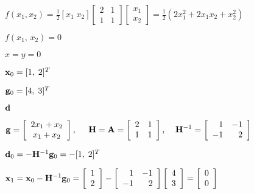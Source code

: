 \documentclass{article}
\def\lthtmlcheckvsize{\ifdim\ht\sizebox<\vsize 
  \ifdim\wd\sizebox<\hsize\expandafter\hfill\fi \expandafter\vfill
  \else\expandafter\vss\fi}%
\begin{document}
{\newpage\clearpage
{}%
$\displaystyle f(x_1,x_2)=\frac{1}{2}[x_1\;x_2]\left[\begin{array}{cc}2&1\\1&1\end{array}\right]
\left[\begin{array}{c}x_1\\x_2\end{array}\right]=\frac{1}{2}(2x_1^2+2x_1x_2+x_2^2)$%
\lthtmlindisplaymathZ
\lthtmlcheckvsize\clearpage}

{\newpage\clearpage
{}%
$ f(x_1,\,x_2)=0$%
\lthtmlindisplaymathZ
\lthtmlcheckvsize\clearpage}

{\newpage\clearpage
{}%
$ x=y=0$%
\lthtmlindisplaymathZ
\lthtmlcheckvsize\clearpage}

{\newpage\clearpage
{}%
$ {\bf x}_0=[1,\;2]^T$%
\lthtmlindisplaymathZ
\lthtmlcheckvsize\clearpage}

{\newpage\clearpage
{}%
$ {\bf g}_0=[4,\;3]^T$%
\lthtmlindisplaymathZ
\lthtmlcheckvsize\clearpage}

{\newpage\clearpage
{}%
$ {\bf d}$%
\lthtmlindisplaymathZ
\lthtmlcheckvsize\clearpage}

{\newpage\clearpage
{}%
$\displaystyle {\bf g}=\left[\begin{array}{c}2x_1+x_2\\x_1+x_2\end{array}\right],\;\;\;\;\;
{\bf H}={\bf A}=\left[\begin{array}{cc}2&1\\1&1\end{array}\right],\;\;\;\;
{\bf H}^{-1}=\left[\begin{array}{rr}1&-1\\-1&2\end{array}\right]$%
\lthtmlindisplaymathZ
\lthtmlcheckvsize\clearpage}

{\newpage\clearpage
{}%
$ {\bf d}_0=-{\bf H}^{-1}{\bf g}_0=-[1,\;2]^T$%
\lthtmlindisplaymathZ
\lthtmlcheckvsize\clearpage}

{\newpage\clearpage
{}%
$\displaystyle {\bf x}_1={\bf x}_0-{\bf H}^{-1}{\bf g}_0=\left[\begin{array}{rr}1\\
2\end{array}\right]
-\left[\begin{array}{rr}1&-1\\-1&2\end{array}\right]
\left[\begin{array}{r}4\\3\end{array}\right]
=\left[\begin{array}{r}0\\0\end{array}\right]$%
\lthtmlindisplaymathZ
\lthtmlcheckvsize\clearpage}
\end{document}
